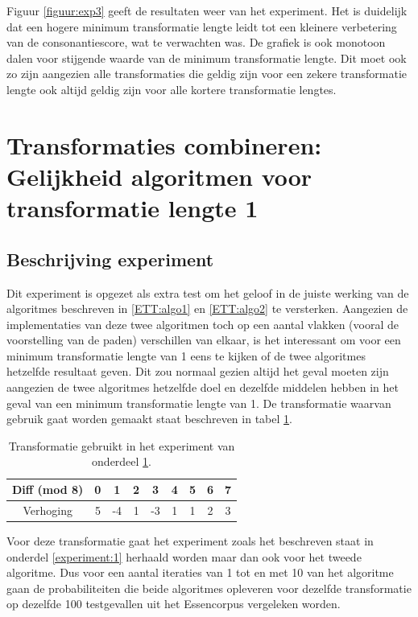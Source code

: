Figuur \ref{figuur:exp3} geeft de resultaten weer van het experiment. Het is duidelijk dat een hogere minimum transformatie lengte leidt tot een kleinere verbetering van de consonantiescore, wat te verwachten was. De grafiek is ook monotoon dalen voor stijgende waarde van de minimum transformatie lengte. Dit moet ook zo zijn aangezien alle transformaties die geldig zijn voor een zekere transformatie lengte ook altijd geldig zijn voor alle kortere transformatie lengtes.

\section{Transformaties combineren: Gelijkheid algoritmen voor transformatie lengte 1}
\label{experiment:4}
\subsection{Beschrijving experiment}
Dit experiment is opgezet als extra test om het geloof in de juiste werking van de algoritmes beschreven in \ref{ETT:algo1} en \ref{ETT:algo2} te versterken. Aangezien de implementaties van deze twee algoritmen toch op een aantal vlakken (vooral de voorstelling van de paden) verschillen van elkaar, is het interessant om voor een minimum transformatie lengte van 1 eens te kijken of de twee algoritmes hetzelfde resultaat geven. Dit zou normaal gezien altijd het geval moeten zijn aangezien de twee algoritmes hetzelfde doel en dezelfde middelen hebben in het geval van een minimum transformatie lengte van 1. De transformatie waarvan gebruik gaat worden gemaakt staat beschreven in tabel \ref{tabel:exp4}.

\begin{table}
  \centering
  \begin{tabular}{c | c c c c c c c c }
    Diff (mod 8) & 0 & 1 & 2 & 3 & 4 & 5 & 6 & 7 \\
    \hline
    \hline
    Verhoging & 5 & -4 & 1 & -3 & 1 & 1 & 2 & 3 \\
  \end{tabular}
  \caption{Transformatie gebruikt in het experiment van onderdeel \ref{experiment:4}.}
  \label{tabel:exp4}
\end{table}

Voor deze transformatie gaat het experiment zoals het beschreven staat in onderdel \ref{experiment:1} herhaald worden maar dan ook voor het tweede algoritme. Dus voor een aantal iteraties van 1 tot en met 10 van het algoritme gaan de probabiliteiten die beide algoritmes opleveren voor dezelfde transformatie op dezelfde 100 testgevallen uit het Essencorpus vergeleken worden.

